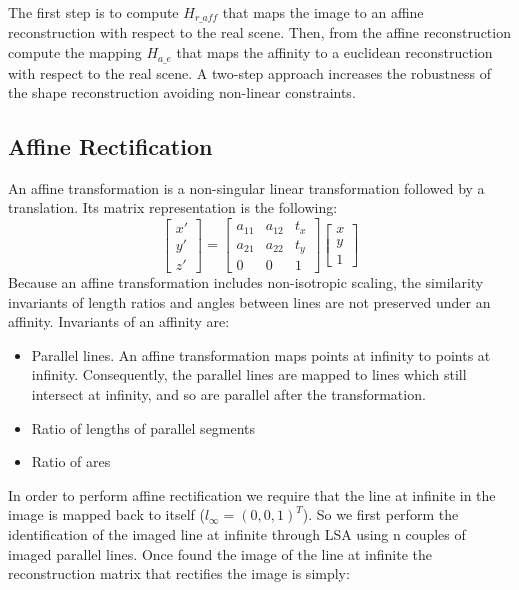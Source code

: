 \documentclass[11pt, oneside]{article}   	%
\begin{document}
The first step is to compute $H_{r\_aff}$ that maps the image to an affine reconstruction with respect to the real scene. Then, from the affine reconstruction compute the mapping $H_{a\_e}$ that maps the affinity to a euclidean reconstruction with respect to the real scene. A two-step approach increases the robustness of the shape reconstruction avoiding non-linear constraints. 

\subsection{Affine Rectification}
An affine transformation is a non-singular linear transformation followed by a translation.
Its matrix representation is the following:
\begin{equation}
\begin{bmatrix}
x' \\ y' \\ z' 
\end{bmatrix}
= 
\begin{bmatrix}
a_{11} & a_{12} & t_x \\ a_{21} & a_{22} & t_y  \\ 0 & 0 & 1
\end{bmatrix}
\begin{bmatrix}
x \\ y \\ 1
\end{bmatrix}
\end{equation}
Because an affine transformation includes non-isotropic scaling, the similarity invariants of length ratios and angles between lines are not preserved under an affinity.
Invariants of an affinity are:
\begin{itemize}
\item Parallel lines. An affine transformation maps points at infinity to points  at infinity. Consequently, the parallel lines are mapped to lines which still intersect at infinity, and so are parallel after the transformation.
\item Ratio of lengths of parallel segments
\item Ratio of ares
\end{itemize}

In order to perform affine rectification we require that the line at infinite in the image is mapped back to itself ($l_{\infty} = (0,0,1)^{T}$).
So we first perform the identification of the imaged line at infinite through LSA using n couples of imaged parallel lines. 
Once found the image of the line at infinite the reconstruction matrix that rectifies the image is simply:
\end{document}

